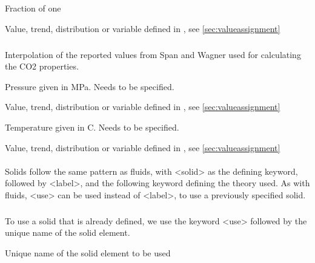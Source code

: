 {
 \slist
   \item \Description Fraction of one
   \item \Argument Value, trend, distribution or variable defined in , see \autoref{sec:valueassignment}
   \item \Default
 \elist

\subparagraph{}
 \slist
   \item \Description Interpolation of the reported values from Span and Wagner used for calculating the CO2 properties.
   \item \Argument 
   \item \Default 
 \elist

 \slist
   \item \Description Pressure given in MPa. Needs to be specified.
   \item \Argument Value, trend, distribution or variable defined in , see \autoref{sec:valueassignment}
   \item \Default
 \elist

 \slist
   \item \Description Temperature given in C. Needs to be specified.
   \item \Argument Value, trend, distribution or variable defined in , see \autoref{sec:valueassignment}
   \item \Default
 \elist


\paragraph{}
 \slist
   \item \Description Solids follow the same pattern as fluids, with <solid> as the defining keyword, followed by <label>, and the following keyword defining the theory used. As with fluids, <use> can be used instead of <label>, to use a previously specified solid.
   \item \Argument 
   \item \Default 
 \elist

\subparagraph{}
 \slist
   \item \Description  To use a solid that is already defined, we use the keyword <use> followed by the unique name of the solid element.
   \item \Argument Unique name of the solid element to be used
   \item \Default 
 \elist

}
